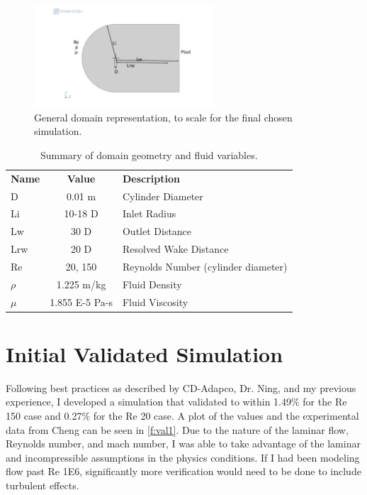 \documentclass[10pt,english]{article}
\begin{document}
\begin{figure}[h!]
\centering
\includegraphics[trim={6.5cm 2.5cm 4.0cm 3cm},clip,width=0.60\textwidth]{domain}
\caption{General domain representation, to scale for the final chosen simulation.}
\label{f:domain}
\end{figure}

\begin{table}[h]
\vspace{20pt}
\centering
  \begin{tabular}{lcl}
    \textbf{Name} & \textbf{Value} & \textbf{Description}  \\
    D & 0.01 m & Cylinder Diameter  \\
    Li & 10-18 D & Inlet Radius\\
    Lw & 30 D & Outlet Distance\\
    Lrw & 20 D & Resolved Wake Distance\\
    Re & 20, 150 & Reynolds Number (cylinder diameter)\\
    $\rho$  & 1.225 m/kg & Fluid Density\\
    $\mu$  & 1.855 E-5 Pa-s & Fluid Viscosity\\ 
  \end{tabular}
  \caption{Summary of domain geometry and fluid variables.}
  \label{tab:params}
\end{table}



\vspace{5pt}
\section{Initial Validated Simulation}

Following best practices as described by CD-Adapco, Dr. Ning, and my previous experience, I developed a simulation that validated to within 1.49\% for the Re 150 case and 0.27\% for the Re 20 case.  A plot of the values and the experimental data from Cheng can be seen in \cref{f:val1}.  Due to the nature of the laminar flow, Reynolds number, and mach number, I was able to take advantage of the laminar and incompressible assumptions in the physics conditions.  If I had been modeling flow past Re 1E6, significantly more verification would need to be done to include turbulent effects.
\end{document}
